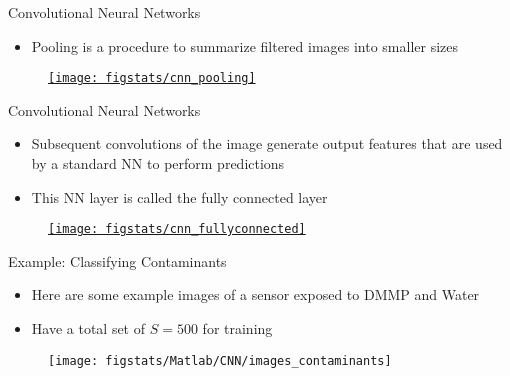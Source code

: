 \documentclass[9pt]{beamer}
\begin{document}
\begin{frame}{Convolutional Neural Networks}

\begin{itemize}
\item Pooling is a procedure to summarize filtered images into smaller sizes
\end{itemize}

\begin{figure}[!htb]
    \centering
		\href{https://towardsdatascience.com/a-comprehensive-guide-to-convolutional-neural-networks-the-eli5-way-3bd2b1164a53}{\texttt{[image: figstats/cnn\_pooling]}}
\end{figure}

\end{frame}

\begin{frame}{Convolutional Neural Networks}

\begin{itemize}
\item Subsequent convolutions of the image generate output features that are used by a standard NN to perform predictions
\item This NN layer is called the fully connected layer
\end{itemize}

\begin{figure}[!htb]
    \centering
		\href{https://towardsdatascience.com/a-comprehensive-guide-to-convolutional-neural-networks-the-eli5-way-3bd2b1164a53}{\texttt{[image: figstats/cnn\_fullyconnected]}}
\end{figure}

\end{frame}

\begin{frame}{Example: Classifying Contaminants}

\begin{itemize}
\item Here are some example images of a sensor exposed to DMMP and Water 
\item Have a total set of $S=500$ for training 
\end{itemize}

\begin{figure}[!htb]
    \centering
\texttt{[image: figstats/Matlab/CNN/images\_contaminants]}
\end{figure}

\end{frame}
\end{document}
